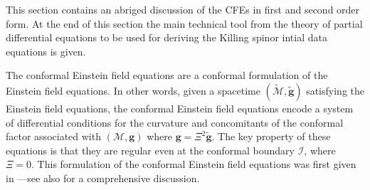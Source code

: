 \documentclass[10pt,a4paper]{article}
\theoremstyle{plain}
\def\bmg{{\bm g}}
\begin{document}
\medskip

This section contains an abriged discussion of the CFEs in first and second order form.
At the end of this section the main technical tool from the theory of partial differential
equations to be used for deriving the Killing spinor intial data equations is given.

\medskip
 

The conformal Einstein field equations are a conformal formulation of
the Einstein field equations. In other words, given a spacetime
$(\tilde{\mathcal{M}},\tilde{\bmg})$ satisfying the Einstein field
equations, the conformal Einstein field equations encode a system of
differential conditions for the curvature and concomitants of the
conformal factor associated with $(\mathcal{M},\bmg)$ where
$\bmg=\Xi^2\tilde{\bmg}$. The key property of these equations is that
they are regular even at the conformal boundary $\mathscr{I}$, where
$\Xi=0$.  This formulation of the conformal Einstein field equations
was first given in \cite{Fri81a} ---see also \cite{CFEbook} for a
comprehensive discussion.

\medskip
\end{document}
